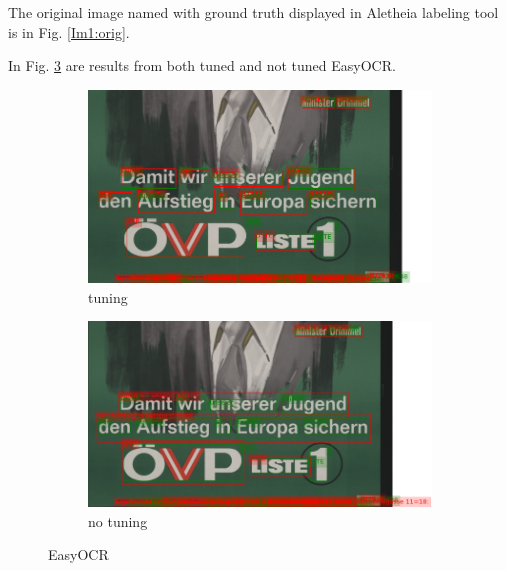 
The original image named %
with ground truth displayed in Aletheia labeling tool is in Fig. \ref{Im1:orig}. 

In Fig. \ref{Im1:ex:EasyOCR} are results from both tuned and not tuned EasyOCR. 

\begin{figure}[hbtp!]
    \begin{subfigure}{\textwidth}
        \centering
        \includegraphics[scale=0.36]{obrazky/plakaty/result_easyOCR_vienna1_split_tuning-91.png}
        \caption{tuning}
        \label{Im1:ex:easytun}
    \end{subfigure}

    \begin{subfigure}{\textwidth}
        \centering
        \includegraphics[scale=0.36]{obrazky/plakaty/result_easyOCR_vienna1_nosplit_notuning-91.png}
        \caption{no tuning}
        \label{Im1:ex:easy}
    \end{subfigure}
    \caption{EasyOCR}
    \label{Im1:ex:EasyOCR}
\end{figure}

